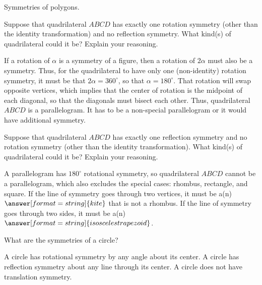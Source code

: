 \documentclass[nooutcomes]{ximera}
\begin{document}
Symmetries of polygons.  

\begin{question}
Suppose that quadrilateral $ABCD$ has exactly one rotation symmetry (other than the identity transformation) and no reflection symmetry.  What kind(s) of quadrilateral could it be?  Explain your reasoning.  
\begin{freeResponse}
\begin{hint}
If a rotation of $\alpha$ is a symmetry of a figure, then a rotation of $2\alpha$ must also be a symmetry.  Thus, for the quadrilateral to have only one (non-identity) rotation symmetry, it must be that $2\alpha = 360^\circ$, so that $\alpha = 180^\circ$.  That rotation will swap opposite vertices, which implies that the center of rotation is the midpoint of each diagonal, so that the diagonals must bisect each other.  Thus, quadrilateral $ABCD$ is a parallelogram.  It has to be a non-special parallelogram or it would have additional symmetry.  
\end{hint}
\end{freeResponse}
\end{question}

\begin{question}
Suppose that quadrilateral $ABCD$ has exactly one reflection symmetry and no rotation symmetry (other than the identity transformation).  What kind(s) of quadrilateral could it be?  Explain your reasoning.  
\begin{freeResponse}
\begin{hint}
A parallelogram has $180^\circ$ rotational symmetry, so quadrilateral $ABCD$ cannot be a parallelogram, which also excludes the special cases: rhombus, rectangle, and square.  If the line of symmetry goes through two vertices, 
it must be a(n) $\answer[format=string]{kite}$ that is not a rhombus.  If the line of symmetry goes through two sides, it must be a(n) $\answer[format=string]{isosceles trapezoid}$.  
\end{hint}
\end{freeResponse}
\end{question}

\begin{question}
What are the symmetries of a circle? 
\begin{freeResponse}
\begin{hint}
A circle has rotational symmetry by any angle about its center.  A circle has reflection symmetry about any line through its center.  A circle does not have translation symmetry.  
\end{hint}
\end{freeResponse}
\end{question}
\end{document}
